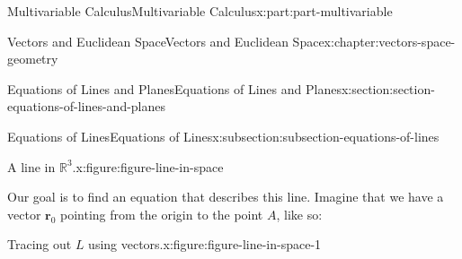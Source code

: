 \documentclass[twoside,10pt,]{tufte-book}
\numberwithin{equation}{part}
\begin{document}
\begin{partptx}{Multivariable Calculus}{}{Multivariable Calculus}{}{}{x:part:part-multivariable}
\begin{chapterptx}{Vectors and Euclidean Space}{}{Vectors and Euclidean Space}{}{}{x:chapter:vectors-space-geometry}
\begin{sectionptx}{Equations of Lines and Planes}{}{Equations of Lines and Planes}{}{}{x:section:section-equations-of-lines-and-planes}
\begin{subsectionptx}{Equations of Lines}{}{Equations of Lines}{}{}{x:subsection:subsection-equations-of-lines}
\begin{figureptx}{A line in \(\mathbb{R}^{3}\).}{x:figure:figure-line-in-space}{}
\begin{image}{0.05}{0.9}{0.05}
{
}%
\end{image}%
\tcblower
\end{figureptx}%
Our goal is to find an equation that describes this line. Imagine that we have a vector \(\mathbf{r}_{0}\) pointing from the origin to the point \(A\), like so:%
\begin{figureptx}{Tracing out \(L\) using vectors.}{x:figure:figure-line-in-space-1}{}%
\begin{image}{0.05}{0.9}{0.05}%
\end{image}
\end{figureptx}
\end{subsectionptx}
\end{sectionptx}
\end{chapterptx}
\end{partptx}
\end{document}
